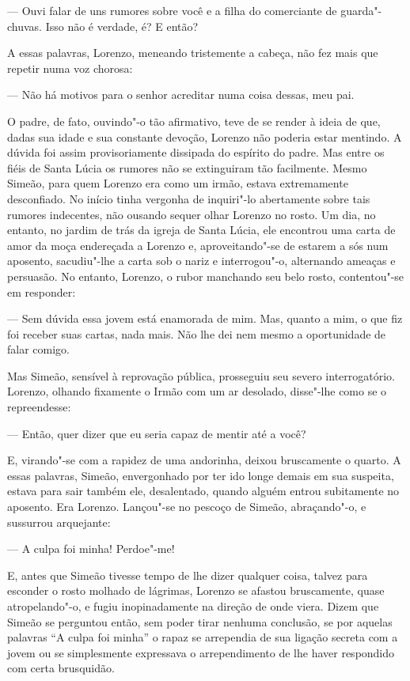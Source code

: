--- Ouvi falar de uns rumores sobre você e a filha do comerciante de
guarda"-chuvas. Isso não é verdade, é? E então?

A essas palavras, Lorenzo, meneando tristemente a cabeça, não fez mais
que repetir numa voz chorosa:

--- Não há motivos para o senhor acreditar numa coisa dessas, meu pai.

O padre, de fato, ouvindo"-o tão afirmativo, teve de se render à ideia de
que, dadas sua idade e sua constante devoção, Lorenzo não poderia estar
mentindo. A dúvida foi assim provisoriamente dissipada do espírito do
padre. Mas entre os fiéis de Santa Lúcia os rumores não se extinguiram
tão facilmente. Mesmo Simeão, para quem Lorenzo era como um irmão,
estava extremamente desconfiado. No início tinha vergonha de inquiri"-lo
abertamente sobre tais rumores indecentes, não ousando sequer olhar
Lorenzo no rosto. Um dia, no entanto, no jardim de trás da igreja de
Santa Lúcia, ele encontrou uma carta de amor da moça endereçada a
Lorenzo e, aproveitando"-se de estarem a sós num aposento, sacudiu"-lhe a
carta sob o nariz e interrogou"-o, alternando ameaças e persuasão. No
entanto, Lorenzo, o rubor manchando seu belo rosto, contentou"-se em
responder:

--- Sem dúvida essa jovem está enamorada de mim. Mas, quanto a mim, o que
fiz foi receber suas cartas, nada mais. Não lhe dei nem mesmo a
oportunidade de falar comigo.

Mas Simeão, sensível à reprovação pública, prosseguiu seu severo
interrogatório. Lorenzo, olhando fixamente o Irmão com um ar desolado,
disse"-lhe como se o repreendesse:

--- Então, quer dizer que eu seria capaz de mentir até a você?

E, virando"-se com a rapidez de uma andorinha, deixou bruscamente o
quarto. A essas palavras, Simeão, envergonhado por ter ido longe demais
em sua suspeita, estava para sair também ele, desalentado, quando
alguém entrou subitamente no aposento. Era Lorenzo. Lançou"-se no
pescoço de Simeão, abraçando"-o, e sussurrou arquejante:

--- A culpa foi minha! Perdoe"-me!

E, antes que Simeão tivesse tempo de lhe dizer qualquer coisa, talvez
para esconder o rosto molhado de lágrimas, Lorenzo se afastou
bruscamente, quase atropelando"-o, e fugiu inopinadamente na direção de
onde viera. Dizem que Simeão se perguntou então, sem poder tirar
nenhuma conclusão, se por aquelas palavras ``A culpa foi minha'' o rapaz
se arrependia de sua ligação secreta com a jovem ou se simplesmente
expressava o arrependimento de lhe haver respondido com certa
brusquidão.

